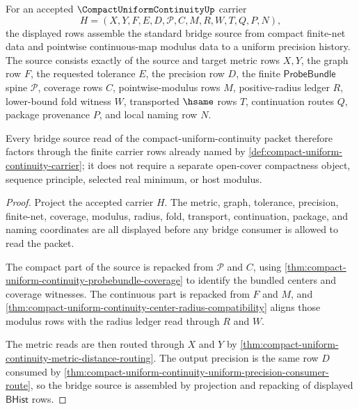 \begin{theorem}
\label{thm:compact-uniform-continuity-bridge-source-packet}
For an accepted $\CompactUniformContinuityUp$ carrier
$$
H=(X,Y,F,E,D,\mathcal{P},C,M,R,W,T,Q,P,N),
$$
the displayed rows assemble the standard bridge source from compact finite-net data and pointwise continuous-map modulus data to a uniform precision history. The source consists exactly of the source and target metric rows $X,Y$, the graph row $F$, the requested tolerance $E$, the precision row $D$, the finite $\mathsf{ProbeBundle}$ spine $\mathcal{P}$, coverage rows $C$, pointwise-modulus rows $M$, positive-radius ledger $R$, lower-bound fold witness $W$, transported $\hsame$ rows $T$, continuation routes $Q$, package provenance $P$, and local naming row $N$.

Every bridge source read of the compact-uniform-continuity packet therefore factors through the finite carrier rows already named by \autoref{def:compact-uniform-continuity-carrier}; it does not require a separate open-cover compactness object, sequence principle, selected real minimum, or host modulus.
\end{theorem}
\begin{proof}
Project the accepted carrier $H$. The metric, graph, tolerance, precision, finite-net, coverage, modulus, radius, fold, transport, continuation, package, and naming coordinates are all displayed before any bridge consumer is allowed to read the packet.

The compact part of the source is repacked from $\mathcal{P}$ and $C$, using \autoref{thm:compact-uniform-continuity-probebundle-coverage} to identify the bundled centers and coverage witnesses. The continuous part is repacked from $F$ and $M$, and \autoref{thm:compact-uniform-continuity-center-radius-compatibility} aligns those modulus rows with the radius ledger read through $R$ and $W$.

The metric reads are then routed through $X$ and $Y$ by \autoref{thm:compact-uniform-continuity-metric-distance-routing}. The output precision is the same row $D$ consumed by \autoref{thm:compact-uniform-continuity-uniform-precision-consumer-route}, so the bridge source is assembled by projection and repacking of displayed $\mathsf{BHist}$ rows.
\end{proof}

